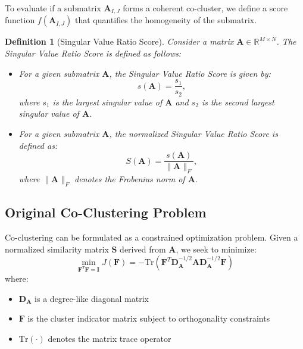 \documentclass[journal]{IEEEtran}
\newtheorem{definition}{Definition}
\begin{document}
To evaluate if a submatrix $\mathbf{A}_{I, J}$ forms a coherent co-cluster, we define a score function \( f(\mathbf{A}_{I, J}) \) that quantifies the homogeneity of the submatrix.

\begin{definition}[Singular Value Ratio Score]
    \label{def:co_cluster}
    Consider a matrix \(\mathbf{A} \in \mathbb{R}^{M \times N}\). The Singular Value Ratio Score is defined as follows:
    \begin{itemize}
        \item For a given submatrix \(\mathbf{A}\), the Singular Value Ratio Score is given by:
              \begin{equation}
                  s(\mathbf{A}) = \frac{s_1}{s_2},
              \end{equation}
              where \(s_1\) is the largest singular value of \(\mathbf{A}\) and \(s_2\) is the second largest singular value of \(\mathbf{A}\).
        \item For a given submatrix \(\mathbf{A}\), the normalized Singular Value Ratio Score is defined as:
              \begin{equation}
                  S(\mathbf{A}) = \frac{s(\mathbf{A})}{\|\mathbf{A}\|_F},
              \end{equation}
              where \(\|\mathbf{A}\|_F\) denotes the Frobenius norm of \(\mathbf{A}\).
    \end{itemize}
\end{definition}

\subsection{Original Co-Clustering Problem}
Co-clustering can be formulated as a constrained optimization problem. Given a normalized similarity matrix $\mathbf{S}$ derived from $\mathbf{A}$, we seek to minimize:
\begin{equation}
    \label{eq:objective}
    \min_{\mathbf{F}^T \mathbf{F} = \mathbf{I}} J(\mathbf{F}) = -\text{Tr}\left(\mathbf{F}^T \mathbf{D}_{\mathbf{A}}^{-1/2}\mathbf{A}\mathbf{D}_{\mathbf{A}}^{-1/2}\mathbf{F}\right)
\end{equation}
where:
\begin{itemize}
    \item $\mathbf{D}_{\mathbf{A}}$ is a degree-like diagonal matrix
    \item $\mathbf{F}$ is the cluster indicator matrix subject to orthogonality constraints
    \item $\text{Tr}(\cdot)$ denotes the matrix trace operator
\end{itemize}
\end{document}
